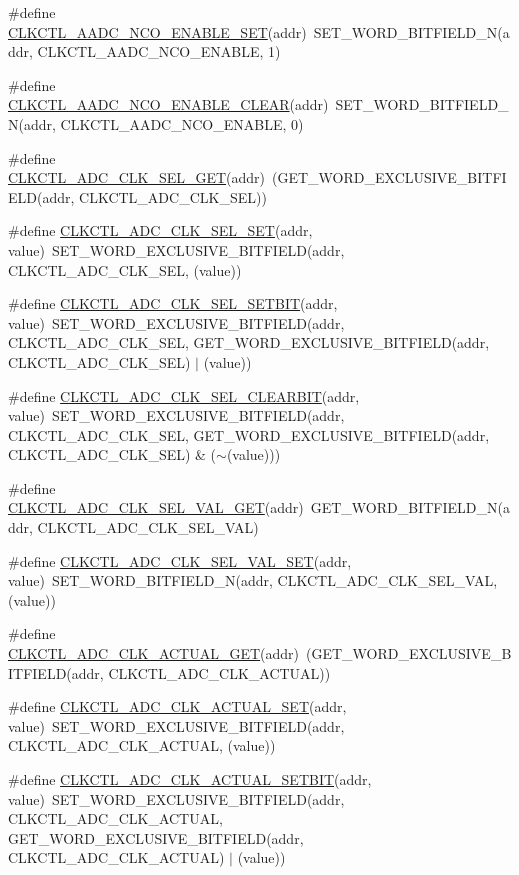 \begin{DoxyCompactItemize}
\item 
\#define \hyperlink{a00544_a60c3c4b7bb78138ce97923573ae58d25}{CLKCTL\_\-AADC\_\-NCO\_\-ENABLE\_\-SET}(addr)~SET\_\-WORD\_\-BITFIELD\_\-N(addr, CLKCTL\_\-AADC\_\-NCO\_\-ENABLE, 1)
\item 
\#define \hyperlink{a00544_adfab542eea09662fb7b24dea1c32617d}{CLKCTL\_\-AADC\_\-NCO\_\-ENABLE\_\-CLEAR}(addr)~SET\_\-WORD\_\-BITFIELD\_\-N(addr, CLKCTL\_\-AADC\_\-NCO\_\-ENABLE, 0)
\item 
\#define \hyperlink{a00544_a3dcbf1c804be95e8cddafdbd791a9050}{CLKCTL\_\-ADC\_\-CLK\_\-SEL\_\-GET}(addr)~(GET\_\-WORD\_\-EXCLUSIVE\_\-BITFIELD(addr, CLKCTL\_\-ADC\_\-CLK\_\-SEL))
\item 
\#define \hyperlink{a00544_a31be295e25a1e873d773d083a430cc96}{CLKCTL\_\-ADC\_\-CLK\_\-SEL\_\-SET}(addr, value)~SET\_\-WORD\_\-EXCLUSIVE\_\-BITFIELD(addr, CLKCTL\_\-ADC\_\-CLK\_\-SEL, (value))
\item 
\#define \hyperlink{a00544_a3ee65cdf3c54e4f9cdbd8c1724fb210d}{CLKCTL\_\-ADC\_\-CLK\_\-SEL\_\-SETBIT}(addr, value)~SET\_\-WORD\_\-EXCLUSIVE\_\-BITFIELD(addr, CLKCTL\_\-ADC\_\-CLK\_\-SEL, GET\_\-WORD\_\-EXCLUSIVE\_\-BITFIELD(addr, CLKCTL\_\-ADC\_\-CLK\_\-SEL) $|$ (value))
\item 
\#define \hyperlink{a00544_a299a029691b75bea39d8c4bd5212bfdb}{CLKCTL\_\-ADC\_\-CLK\_\-SEL\_\-CLEARBIT}(addr, value)~SET\_\-WORD\_\-EXCLUSIVE\_\-BITFIELD(addr, CLKCTL\_\-ADC\_\-CLK\_\-SEL, GET\_\-WORD\_\-EXCLUSIVE\_\-BITFIELD(addr, CLKCTL\_\-ADC\_\-CLK\_\-SEL) \& ($\sim$(value)))
\item 
\#define \hyperlink{a00544_af1cbd48861a1d9eb0a22b11d686b7209}{CLKCTL\_\-ADC\_\-CLK\_\-SEL\_\-VAL\_\-GET}(addr)~GET\_\-WORD\_\-BITFIELD\_\-N(addr, CLKCTL\_\-ADC\_\-CLK\_\-SEL\_\-VAL)
\item 
\#define \hyperlink{a00544_a764a226cb23aaa9f7cb84f1429661385}{CLKCTL\_\-ADC\_\-CLK\_\-SEL\_\-VAL\_\-SET}(addr, value)~SET\_\-WORD\_\-BITFIELD\_\-N(addr, CLKCTL\_\-ADC\_\-CLK\_\-SEL\_\-VAL, (value))
\item 
\#define \hyperlink{a00544_a5c1de3c4a93e0ad20a8441bdd5e314d5}{CLKCTL\_\-ADC\_\-CLK\_\-ACTUAL\_\-GET}(addr)~(GET\_\-WORD\_\-EXCLUSIVE\_\-BITFIELD(addr, CLKCTL\_\-ADC\_\-CLK\_\-ACTUAL))
\item 
\#define \hyperlink{a00544_a47e34fdaf5380e59f9bb9f449fe73126}{CLKCTL\_\-ADC\_\-CLK\_\-ACTUAL\_\-SET}(addr, value)~SET\_\-WORD\_\-EXCLUSIVE\_\-BITFIELD(addr, CLKCTL\_\-ADC\_\-CLK\_\-ACTUAL, (value))
\item 
\#define \hyperlink{a00544_a93461db617e779743072f94d7bd1b9ef}{CLKCTL\_\-ADC\_\-CLK\_\-ACTUAL\_\-SETBIT}(addr, value)~SET\_\-WORD\_\-EXCLUSIVE\_\-BITFIELD(addr, CLKCTL\_\-ADC\_\-CLK\_\-ACTUAL, GET\_\-WORD\_\-EXCLUSIVE\_\-BITFIELD(addr, CLKCTL\_\-ADC\_\-CLK\_\-ACTUAL) $|$ (value))

\end{DoxyCompactItemize}

